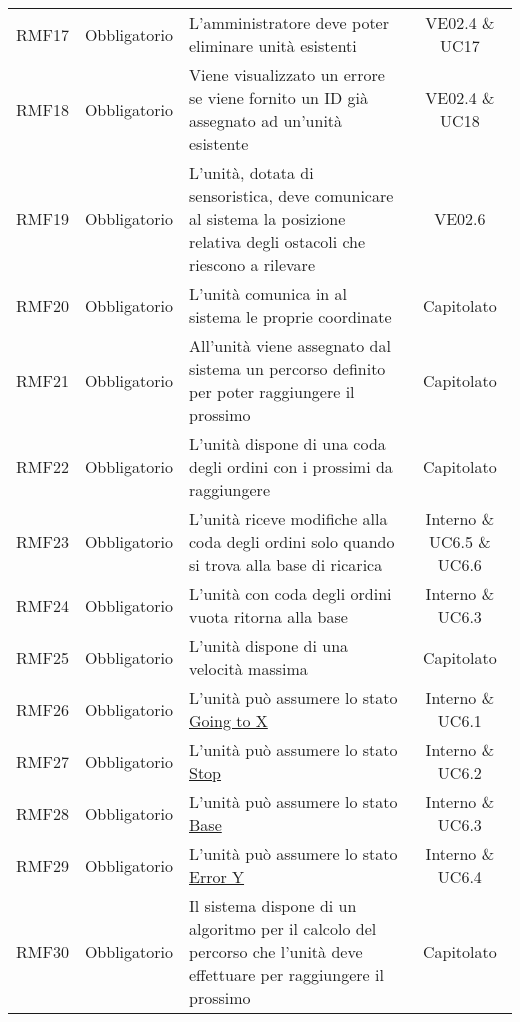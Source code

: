 \begin{longtable}[h!] { c c m{8cm} c}
		RMF17& Obbligatorio & L'amministratore deve poter eliminare unità esistenti & VE02.4 \& UC17 \\
					
		RMF18 & Obbligatorio & Viene visualizzato un errore se viene fornito un ID già assegnato ad un'unità esistente & VE02.4 \& UC18 \\
		
		RMF19 & Obbligatorio & L'unità, dotata di sensoristica, deve comunicare al sistema la posizione relativa degli ostacoli che riescono a rilevare & VE02.6 \\
		
		RMF20 & Obbligatorio & L'unità comunica in \glock{real-time} al sistema le proprie coordinate & Capitolato \\
		
		RMF21 & Obbligatorio & All'unità viene assegnato dal sistema un percorso definito per poter raggiungere il prossimo \glock{POI} & Capitolato \\
		
		RMF22 & Obbligatorio & L'unità dispone di una coda degli ordini con i prossimi \glock{POI} da raggiungere & Capitolato \\
		
		RMF23 & Obbligatorio & L'unità riceve modifiche alla coda degli ordini solo quando si trova alla base di ricarica & Interno \& UC6.5 \& UC6.6 \\
		
		RMF24 & Obbligatorio & L'unità con coda degli ordini vuota ritorna alla base & Interno \& UC6.3 \\
		
		RMF25 & Obbligatorio & L'unità dispone di una velocità massima & Capitolato \\
		
		RMF26 & Obbligatorio & L'unità può assumere lo stato \underline{Going to X} & Interno \& UC6.1 \\
		
		RMF27 & Obbligatorio & L'unità può assumere lo stato \underline{Stop} & Interno \& UC6.2 \\
		
		RMF28 & Obbligatorio & L'unità può assumere lo stato \underline{Base} & Interno \& UC6.3 \\
		
		RMF29 & Obbligatorio & L'unità può assumere lo stato \underline{Error Y} & Interno \& UC6.4 \\
		
		RMF30 & Obbligatorio & Il sistema dispone di un algoritmo per il calcolo del percorso che l'unità deve effettuare per raggiungere il prossimo \glock{POI} & Capitolato \\
		

\end{longtable}
